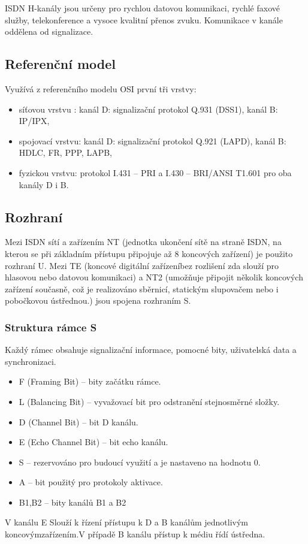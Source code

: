 ISDN H-kanály jsou určeny pro rychlou datovou komunikaci, rychlé faxové služby, telekonference a vysoce kvalitní přenos zvuku. Komunikace v kanále oddělena od signalizace.

\subsection{Referenční model}
Využívá z referenčního modelu OSI první tři vrstvy:
\begin{itemize}
    \item síťovou vrstvu : kanál D: signalizační protokol Q.931 (DSS1), kanál B: IP/IPX,
    \item spojovací vrstvu: kanál D: signalizační protokol Q.921 (LAPD), kanál B: HDLC, FR, PPP, LAPB,
    \item fyzickou vrstvu: protokol I.431 – PRI a I.430 – BRI/ANSI T1.601 pro oba kanály D i B. 
\end{itemize}

\subsection{Rozhraní}
Mezi ISDN sítí a zařízením NT (jednotka ukončení sítě na straně ISDN, na kterou se při základním přístupu připojuje až 8 koncových
zařízení) je použito rozhraní U. Mezi TE (koncové digitální zařízeníbez rozlišení zda slouží pro hlasovou nebo datovou komunikaci) a NT2 (umožňuje připojit několik koncových zařízení současně, což je realizováno sběrnicí, statickým slupovačem nebo i pobočkovou ústřednou.) jsou spojena rozhraním S. 

\subsubsection{Struktura rámce S}
Každý rámec obsahuje signalizační informace, pomocné bity, uživatelská data a synchronizaci.
\begin{itemize}
    \item F (Framing Bit) – bity začátku rámce.
    \item L (Balancing Bit) – vyvažovací bit pro odstranění stejnosměrné složky.
    \item D (Channel Bit) – bit D kanálu.
    \item E (Echo Channel Bit) – bit echo kanálu.
    \item S – rezervováno pro budoucí využití a je nastaveno na hodnotu 0.
    \item A – bit použitý pro protokoly aktivace.
    \item B1,B2 – bity kanálů B1 a B2
\end{itemize}
V kanálu E Slouží k řízení přístupu k D a B kanálům jednotlivým koncovýmzařízením.V případě B kanálu přístup k médiu řídí ústředna. 

